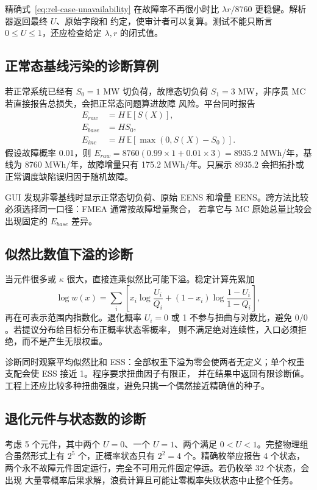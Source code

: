 精确式~\eqref{eq:rel-case-unavailability} 在故障率不再很小时比 $\lambda r/8760$ 更稳健。解析器返回最终 $U$、原始字段和
约定，使审计者可以复算。测试不能只断言 $0\le U\le1$，还应检查给定 $\lambda,r$ 的闭式值。

\subsection{正常态基线污染的诊断算例}
若正常系统已经有 $S_0=1$ MW 切负荷，故障态切负荷 $S_1=3$ MW，非序贯 MC 若直接报告总损失，会把正常态问题算进故障
风险。平台同时报告
\begin{align}
 E_{raw}&=H\,\mathbb E[S(X)],\\
 E_{base}&=HS_0,\\
 E_{inc}&=H\,\mathbb E[\max(0,S(X)-S_0)].
\end{align}
假设故障概率 0.01，则 $E_{raw}=8760(0.99\times1+0.01\times3)=8935.2$ MWh/年，基线为 8760 MWh/年，故障增量只有
175.2 MWh/年。只展示 8935.2 会把拓扑或正常调度缺陷误归因于随机故障。

GUI 发现非零基线时显示正常态切负荷、原始 EENS 和增量 EENS。跨方法比较必须选择同一口径：FMEA 通常按故障增量聚合，
若拿它与 MC 原始总量比较会出现固定的 $E_{base}$ 差异。

\subsection{似然比数值下溢的诊断}
当元件很多或 $\kappa$ 很大，直接连乘似然比可能下溢。稳定计算先累加
\begin{equation}
 \log w(x)=\sum_i\left[x_i\log\frac{U_i}{Q_i}
 +(1-x_i)\log\frac{1-U_i}{1-Q_i}\right],
\end{equation}
再在可表示范围内指数化。退化概率 $U_i=0$ 或 1 不参与扭曲与对数比，避免 $0/0$。若提议分布给目标分布正概率状态零概率，
则不满足绝对连续性，入口必须拒绝，而不是产生无限权重。

诊断同时观察平均似然比和 ESS：全部权重下溢为零会使两者无定义；单个权重支配会使 ESS 接近 1。程序要求扭曲因子有限正，
并在结果中返回有限诊断值。工程上还应比较多种扭曲强度，避免只挑一个偶然接近精确值的种子。

\subsection{退化元件与状态数的诊断}
考虑 5 个元件，其中两个 $U=0$、一个 $U=1$、两个满足 $0<U<1$。完整物理组合虽然形式上有 $2^5$ 个，正概率状态只有
$2^2=4$ 个。精确枚举应报告 4 个状态，两个永不故障元件固定运行，完全不可用元件固定停运。若仍枚举 32 个状态，会出现
大量零概率后果求解，浪费计算且可能让零概率失败状态中止整个任务。

